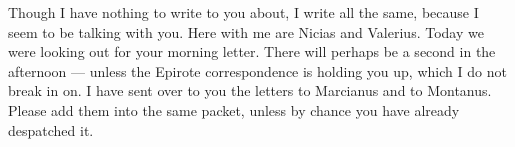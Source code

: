 

 Though I have nothing to write to you about, I write all the same, because I seem to be talking with you. Here with me are Nicias and Valerius. Today we were looking out for your morning letter. There will perhaps be a second in the afternoon --- unless the Epirote correspondence is holding you up, which I do not break in on. I have sent over to you the letters to Marcianus and to Montanus. Please add them into the same packet, unless by chance you have already despatched it.
